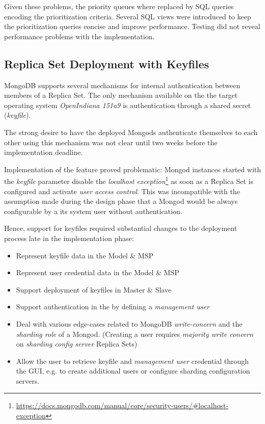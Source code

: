 Given these problems, the priority queues where replaced by SQL queries encoding the prioritization criteria.
Several SQL views were introduced to keep the prioritization queries concise and improve performance.
Testing did not reveal performance problems with the  implementation.

\subsection{Replica Set Deployment with Keyfiles}\label{di:keyfiles}

MongoDB supports several mechanisms for internal authentication between members of a Replica Set. The only mechanism available on the
the target operating system \textit{OpenIndiana 151a9} is authentication through a shared secret (\textit{keyfile}).

The strong desire to have the deployed Mongods authenticate themselves to each other using this mechanism was not clear 
until two weeks before the implementation deadline.

Implementation of the feature proved problematic: Mongod instances started with the \textit{keyfile} parameter disable the 
\textit{localhost exception}\footnote{\url{https://docs.mongodb.com/manual/core/security-users/\#localhost-exception}}
as soon as a Replica Set is configured and activate \textit{user access control}. %
This was incompatible with the assumption made during the design phase that a Mongod would be always configurable by a its system user without authentication.

Hence, support for keyfiles required substantial changes to the deployment process late in the implementation phase:

\begin{itemize}
  \item Represent keyfile data in the Model \& MSP
  \item Represent user credential data in the Model \& MSP
  \item Support deployment of keyfiles in Master \& Slave
  \item Support authentication in the  by defining a \textit{management user}
  \item Deal with various edge-cases related to MongoDB \textit{write-concern} and the \textit{sharding role} of a Mongod. (Creating a user requires \textit{majority write concern} on \textit{sharding config server} Replica Sets)
  \item Allow the user to retrieve keyfile and \textit{management user} credential through the GUI,
        e.g. to create additional users or configure sharding configuration servers.
\end{itemize}

